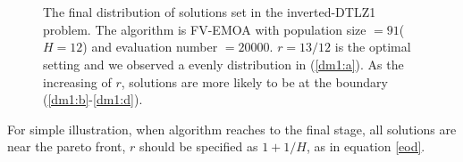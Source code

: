 \documentclass[conference]{IEEEtran}
\begin{document}
\begin{figure}[!t]
  \centering
  \quad
  \\
  \quad
  \\
  \caption{The final distribution of solutions set in the inverted-DTLZ1 problem.
  The algorithm is FV-EMOA with population size $=91$($H=12$) and evaluation number $=20000$.
  $r=13/12$ is the optimal setting and we observed a evenly distribution in (\ref{dm1:a}).
  As the increasing of $r$, solutions are more likely to be at the boundary
  (\ref{dm1:b}-\ref{dm1:d}). 
  }
  \label{dm1}
\end{figure}

For simple illustration,
when algorithm reaches to the final stage, all solutions are near the pareto front, $r$ should
be specified as $1+1/H$, as in equation \ref{eod}. 
\end{document}

